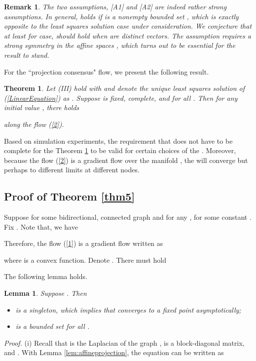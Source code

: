 \documentclass[a4paper, 11pt]{article}
\newtheorem{theorem}{Theorem}
\newtheorem{lemma}{Lemma}
\newtheorem{remark}{Remark}
\begin{document}
\begin{remark}
The two assumptions, [A1] and [A2] are indeed rather strong assumptions. In general,  holds if  is a nonempty bounded set \cite{B-B-SIAM}, which is exactly opposite to the least squares solution case under consideration. We conjecture that at least for  case,  should hold  when  are distinct vectors.  The assumption  requires a strong  symmetry in the affine spaces , which turns out to be essential for the result to stand.
\end{remark}



For the ``projection consensus" flow, we present the following result.

\begin{theorem}\label{thm7}
Let (III) hold with  and  denote the unique least squares solution of (\ref{LinearEquation}) as . Suppose  is fixed, complete, and  for all .
Then    for any  initial value  , there holds

along  the flow (\ref{2}).
\end{theorem}

 Based on simulation experiments,  the requirement that   does not have to be complete for the Theorem \ref{thm7} to be valid for certain choices of the . Moreover, because the flow (\ref{2}) is a gradient flow over the manifold , the  will converge but perhaps to different limits at different nodes.
\subsection{Proof of Theorem \ref{thm5}}
 Suppose  for some bidirectional, connected graph  and for any ,  for some constant .  Fix . Note that, we have


 Therefore, the flow (\ref{1}) is a gradient flow written as

where   is a  convex function.  Denote . There must hold





The following lemma holds.

\begin{lemma}
Suppose . Then  \begin{itemize}
\item[(i)]  is a singleton, which implies that  converges to a fixed point asymptotically;
\item[(ii)]  is a bounded set for all .
\end{itemize}
\end{lemma}
{\it Proof.} (i) Recall that  is the Laplacian of the graph ,    is a block-diagonal matrix, and . With Lemma \ref{lem:affineprojection},  the equation  can be written as
\end{document}
